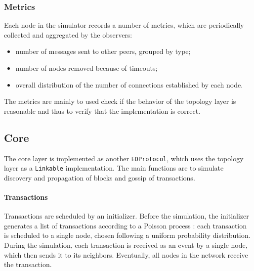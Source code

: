 \subsubsection{Metrics}
Each node in the simulator records a number of metrics, which are periodically collected and aggregated by the observers:
\begin{itemize}
	\item number of messages sent to other peers, grouped by type;
	\item number of nodes removed because of timeouts;
	\item overall distribution of the number of connections established by each node.
\end{itemize}
The metrics are mainly to used check if the behavior of the topology layer is reasonable and thus to verify that the implementation is correct.

\subsection{Core}
The core layer is implemented as another \texttt{EDProtocol}, which uses the topology layer as a \texttt{Linkable} implementation.
The main functions are to simulate discovery and propagation of blocks and gossip of transactions.

\paragraph{Transactions}
Transactions are scheduled by an initializer.
Before the simulation, the initializer generates a list of transactions according to a Poisson process \cite{wikipedia_poisson_process}:
each transaction is scheduled to a single node, chosen following a uniform probability distribution.
During the simulation, each transaction is received as an event by a single node, which then sends it to its neighbors.
Eventually, all nodes in the network receive the transaction.

